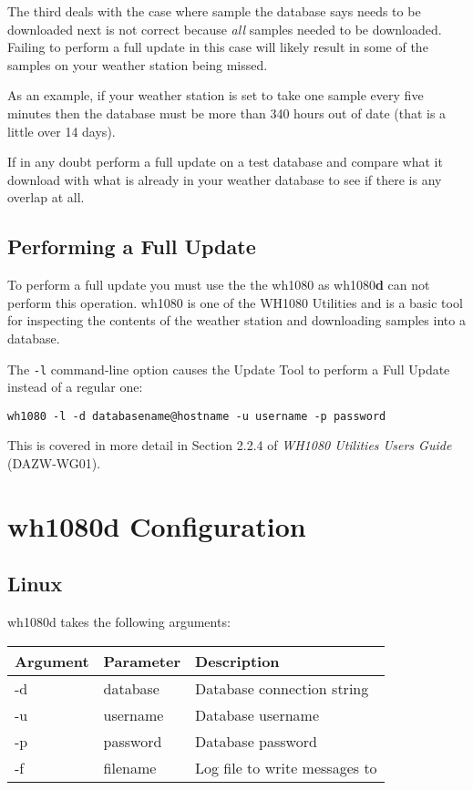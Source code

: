 \documentclass[a4paper,10pt,draft]{book}
\begin{document}
The third deals with the case where sample the database says needs to be downloaded next is not correct because \emph{all} samples needed to be downloaded. Failing to perform a full update in this case will likely result in some of the samples on your weather station being missed.

As an example, if your weather station is set to take one sample every five minutes then the database must be more than 340 hours out of date (that is a little over 14 days).

If in any doubt perform a full update on a test database and compare what it download with what is already in your weather database to see if there is any overlap at all.

\subsection{Performing a Full Update}
To perform a full update you must use the the wh1080 as wh1080\textbf{d} can not perform this operation. wh1080 is one of the WH1080 Utilities and is a basic tool for inspecting the contents of the weather station and downloading samples into a database.

The \verb|-l| command-line option causes the Update Tool to perform a Full Update instead of a regular one:

\verb|wh1080 -l -d databasename@hostname -u username -p password|

This is covered in more detail in Section 2.2.4 of \emph{WH1080 Utilities Users Guide} (DAZW-WG01).

\section{wh1080d Configuration}
\subsection{Linux}

wh1080d takes the following arguments:

\begin{tabular}{l l p{10cm}}
\hline
\textbf{Argument} & \textbf{Parameter} & \textbf{Description} \\
\hline
-d & database & Database connection string \\
-u & username & Database username \\
-p & password & Database password \\
-f & filename & Log file to write messages to \\
\hline
\end{tabular}
\end{document}
